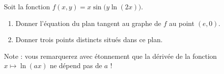 
\begin{exercice}\label{exoOutilsMath-0088}

    Soit la fonction $f(x,y)=x\sin\big( y \ln(2x) \big)$.
    \begin{enumerate}
        \item
            Donner l'équation du plan tangent au graphe de $f$ au point $(e,0)$.
        \item
            Donner trois points distincts situés dans ce plan.
    \end{enumerate}

    Note : vous remarquerez avec étonnement que la dérivée de la fonction $x\mapsto \ln(ax)$ ne dépend pas de $a$ !

\end{exercice}
